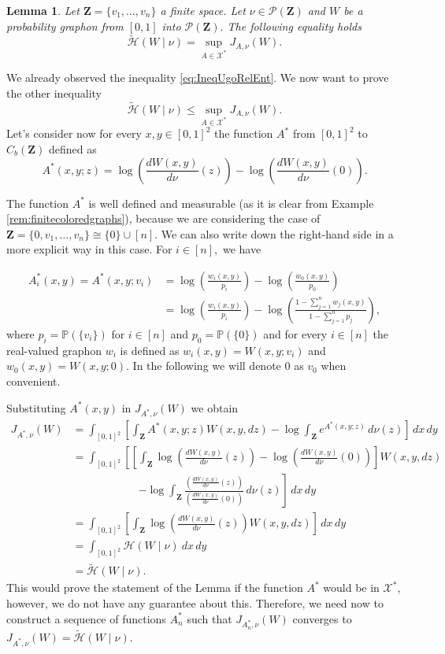 \documentclass[12pt,twoside,a4paper]{article}
\newtheorem{lemma}[theorem]{Lemma}
\newcommand{\cP}{{\mathcal P}}  %
\newcommand{\Space}{\mathbf{Z}}
\newcommand{\CbFunct}{C_b(\Space)}
\newcommand{\Ugo}{\mathcal{X}^*}
\begin{document}
\begin{lemma}\label{LemmEquivLemm5.2Chatterjee}
  Let $\Space=\{v_1,\ldots,v_n\}$ a finite space. Let $\nu\in \cP(\Space)$ and $W$ be a probability graphon from $[0,1]$ into $\cP(\Space).$ The following equality holds \[
\widetilde{\mathcal{H}}(W \mid \nu) = \sup_{A \in  \Ugo}J_{A,\nu}(W).
\]
\end{lemma}
\proof
We already observed the inequality \eqref{eq:IneqUgoRelEnt}.
We now want to prove the other inequality \[
\widetilde{\mathcal{H}}(W \mid \nu) \leq \sup_{A \in { \Ugo}}J_{A,\nu}(W).
\]
Let's consider now  for every $x,y\in [0,1]^2$ the function $A^*$ from $[0,1]^2$ to  $\CbFunct$ defined as \begin{equation}\label{eq:AstarLemmaRelEntrGraphon}
    A^*(x,y;z)=\log \left(\frac{dW(x,y)}{d\nu}(z)\right)-\log \left(\frac{dW(x,y)}{d\nu}(0)\right).
\end{equation}

The function $A^*$ is well defined and measurable (as it is clear from Example \ref{rem:finitecoloredgraphs}), because we are considering the case of $\Space=\{0,v_1,\ldots , v_n\}\cong  \{0\}\cup [n].$ We can also write down the right-hand side in a more explicit way in this case. For $i\in  [n],$ we have

\[
\begin{aligned}
A^*_i(x,y)=A^*(x,y;v_i)&= \log \left( \frac{w_i(x,y)}{p_i} \right) - \log \left( \frac{w_0(x,y)}{p_0} \right)\\
&=\log \left( \frac{w_i(x,y)}{p_i} \right) - \log \left( \frac{1 - \sum^n_{j=1} w_j(x,y)}{1 - \sum^n_{j=1}p_j} \right),
\end{aligned}
\]
where $p_i=\mathbb{P}(\{v_i\})$ for $i\in [n]$ and $p_0=\mathbb{P}(\{0\})$ and for every $i\in [n]$ the real-valued graphon $w_i$ is defined as $w_i(x,y)=W(x,y;v_i)$ and $w_0(x,y)=W(x,y;0).$ In the following we will denote $0$ as $v_0$ when convenient.

Substituting $A^*(x,y)$ in $J_{A^*,\nu}(W)$ we obtain
\[
\begin{aligned}
J_{A^*,\nu}(W)&=
\int_{[0,1]^2} \left[ \int_{\Space} A^*(x,y;z) W(x,y,dz) - \log \int_\Space e^{A^*(x,y;z)} \, d\nu(z) \right]\, dx \, dy\\
&=\int_{[0,1]^2}  \left[\left[ \int_{\Space} \log \left(\frac{dW(x,y)}{d\nu}(z)\right)-\log \left(\frac{dW(x,y)}{d\nu}(0)\right) \right]W(x,y,dz)\right.\\  &\qquad \qquad \qquad\left. - \log \int_\Space  \frac{\left(\frac{dW(x,y)}{d\nu}(z)\right)}{\left(\frac{dW(x,y)}{d\nu}(0)\right)} \, d\nu(z) \right]\, dx \, dy\\
&=\int_{[0,1]^2}  \left[ \int_{\Space} \log \left(\frac{dW(x,y)}{d\nu}(z)\right)W(x,y,dz)\right]\, dx \, dy\\&=
\int_{[0,1]^2}\mathcal{H}(W \mid \nu) \ dx \, dy
\\
&=\widetilde{\mathcal{H}}(W \mid \nu).
\end{aligned}
\]
This would prove the statement of the Lemma if the function $A^*$ would be in $\Ugo$, however, we do not have any guarantee about this. Therefore, we need now to construct a sequence of functions $A^*_n$ such that $J_{A^*_n,\nu}(W)$ converges to $J_{A^*,\nu}(W)=\widetilde{\mathcal{H}}(W \mid \nu).$ 
\end{document}
